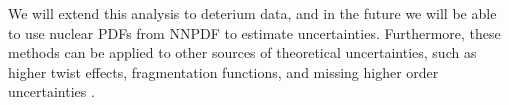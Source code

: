 We will extend this analysis to deterium data, and in the future we will be able to use nuclear PDFs from NNPDF \cite{Khalek:2018bbv} to estimate uncertainties. Furthermore, these methods can be applied to other sources of theoretical uncertainties, such as higher twist effects, fragmentation functions, and missing higher order uncertainties \cite{AbdulKhalek:2019bux}.
